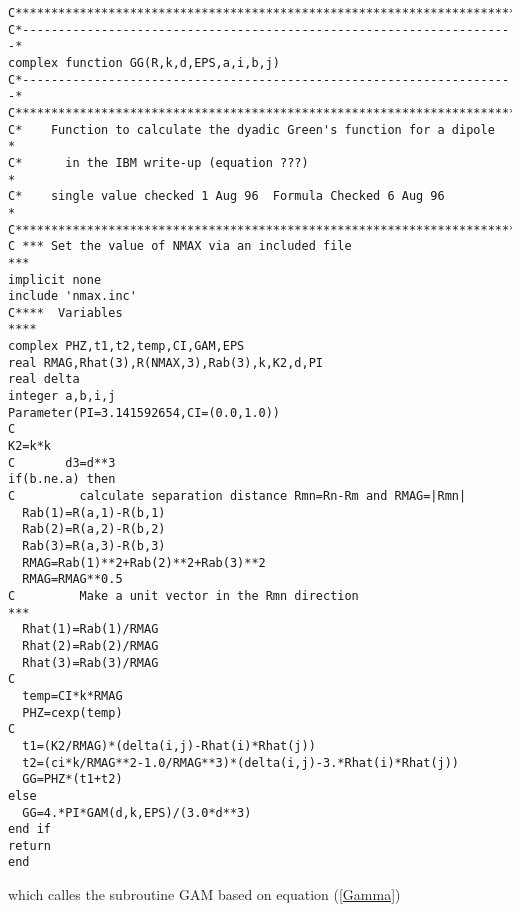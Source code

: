\documentclass{article}
\begin{document}
\begin{verbatim}
C***********************************************************************
C*---------------------------------------------------------------------*
complex function GG(R,k,d,EPS,a,i,b,j)      
C*---------------------------------------------------------------------*      
C***********************************************************************
C*    Function to calculate the dyadic Green's function for a dipole   *
C*      in the IBM write-up (equation ???)                             *
C*    single value checked 1 Aug 96  Formula Checked 6 Aug 96          *
C***********************************************************************
C *** Set the value of NMAX via an included file                     ***  
implicit none
include 'nmax.inc'
C****  Variables                                                    ****
complex PHZ,t1,t2,temp,CI,GAM,EPS
real RMAG,Rhat(3),R(NMAX,3),Rab(3),k,K2,d,PI
real delta
integer a,b,i,j
Parameter(PI=3.141592654,CI=(0.0,1.0))
C
K2=k*k 
C       d3=d**3
if(b.ne.a) then
C         calculate separation distance Rmn=Rn-Rm and RMAG=|Rmn|
  Rab(1)=R(a,1)-R(b,1)
  Rab(2)=R(a,2)-R(b,2)
  Rab(3)=R(a,3)-R(b,3)
  RMAG=Rab(1)**2+Rab(2)**2+Rab(3)**2    
  RMAG=RMAG**0.5
C         Make a unit vector in the Rmn direction                    ***
  Rhat(1)=Rab(1)/RMAG 
  Rhat(2)=Rab(2)/RMAG
  Rhat(3)=Rab(3)/RMAG
C                          
  temp=CI*k*RMAG  
  PHZ=cexp(temp) 
C         
  t1=(K2/RMAG)*(delta(i,j)-Rhat(i)*Rhat(j)) 
  t2=(ci*k/RMAG**2-1.0/RMAG**3)*(delta(i,j)-3.*Rhat(i)*Rhat(j))
  GG=PHZ*(t1+t2)  
else
  GG=4.*PI*GAM(d,k,EPS)/(3.0*d**3)
end if        
return
end
\end{verbatim}%

which calles the subroutine GAM based on equation (\ref{Gamma})
\end{document}
